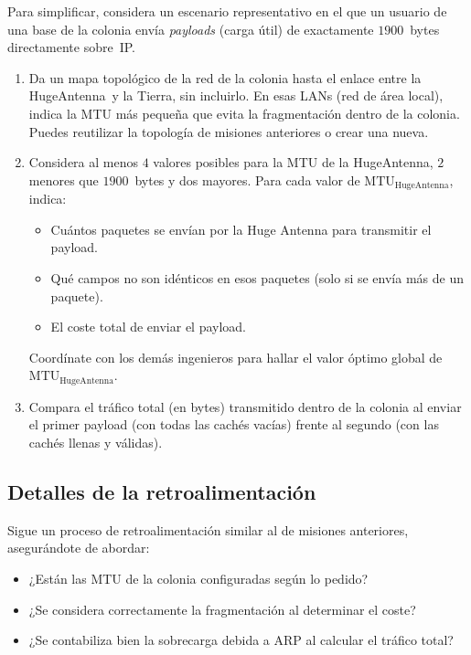\noindent
Para simplificar, considera un escenario representativo en el que un usuario de una base de la colonia envía
\textit{payloads} (carga útil) de exactamente $1900$~bytes directamente sobre~IP.

\begin{enumerate}[itemsep=0.1cm]
\item Da un mapa topológico de la red de la colonia hasta el enlace entre la HugeAntenna\texttrademark\  y la Tierra, sin incluirlo. En esas LANs (red de área local), indica la MTU más pequeña que evita la fragmentación dentro de la colonia.
Puedes reutilizar la topología de misiones anteriores o crear una nueva.

\item Considera al menos $4$ valores posibles para la MTU de la HugeAntenna, $2$ menores que $1900$~bytes y dos mayores. Para cada valor de $\textrm{MTU}_\textrm{HugeAntenna}$, indica:
  \begin{itemize}
  \item Cuántos paquetes se envían por la Huge Antenna para transmitir el payload.
  \item Qué campos no son idénticos en esos paquetes (solo si se envía más de un paquete).
  \item El coste total de enviar el payload.
  \end{itemize}
Coordínate con los demás ingenieros para hallar el valor óptimo global de $\textrm{MTU}_\textrm{HugeAntenna}$.

\item Compara el tráfico total (en bytes) transmitido dentro de la colonia al enviar el primer payload (con todas las cachés vacías) frente al segundo (con las cachés llenas y válidas).
\end{enumerate}


\subsection*{Detalles de la retroalimentación}

Sigue un proceso de retroalimentación similar al de misiones anteriores, asegurándote de abordar:
\begin{itemize}
\item ¿Están las MTU de la colonia configuradas según lo pedido?
\item ¿Se considera correctamente la fragmentación al determinar el coste?
\item ¿Se contabiliza bien la sobrecarga debida a ARP al calcular el tráfico total?
\end{itemize}

